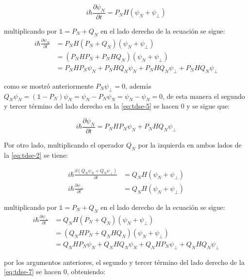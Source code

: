 \begin{equation}
   \label{eq:tdse-4}
  i\hbar\frac{\partial \psi_N}{\partial t} = P_NH (\psi_N + \psi_{\perp})
\end{equation}

multiplicando por $\mathbb{1}=P_N + Q_N$ en el lado derecho de la ecuación se sigue:
\begin{align}
  \label{eq:tdse-5}
 i\hbar\frac{\partial \psi_N}{\partial t}&= P_NH(P_N + Q_N) (\psi_N + \psi_{\perp})  \\ 
                                         &= (P_NHP_N + P_NHQ_N)(\psi_N + \psi_{\perp}) \\
  &= P_NHP_N\psi_N + P_NHQ_N\psi_N + P_NHQ_N\psi_{\perp} + P_NHQ_N\psi_{\perp}
\end{align}

como se mostró anteriormente $P_N\psi_{\perp}=0$, además $Q_N \psi_N = (\mathbb{1}-P_N)\psi_N = \psi_N - P_N\psi_N = \psi_N - \psi_N = 0$, de esta manera el segundo y tercer término del lado derecho en la \autoref{eq:tdse-5} se hacen $0$ y se sigue que:

\begin{equation}
  \label{eq:tdse-p1}
  i\hbar\frac{\partial \psi_N}{\partial t} = P_NHP_N\psi_N  + P_NHQ_N\psi_{\perp}
\end{equation}

Por otro lado, multiplicando el operador $Q_N$ por la izquierda en ambos lados de la \autoref{eq:tdse-2} se tiene:

\begin{align}
   \label{eq:tdse-6}
  i\hbar\frac{\partial (Q_N \psi_N + Q_N \psi_{\perp})}{\partial t} &= Q_NH (\psi_N + \psi_{\perp}) \\
  i\hbar\frac{\partial \psi_{\perp}}{\partial t} &= Q_NH (\psi_N + \psi_{\perp})
\end{align}

multiplicando por $\mathbb{1}=P_N + Q_N$ en el lado derecho de la ecuación se sigue:
\begin{align}
  \label{eq:tdse-7}
  i\hbar\frac{\partial \psi_{\perp}}{\partial t}&= Q_NH(P_N + Q_N) (\psi_N + \psi_{\perp})  \\ 
                                         &= (Q_NHP_N + Q_NHQ_N)(\psi_N + \psi_{\perp}) \\
                                          &= Q_NHP_N\psi_N + Q_NHQ_N\psi_N + Q_NHP_N\psi_{\perp} + Q_NHQ_N\psi_{\perp}
\end{align}

por los argumentos anteriores, el segundo y tercer término del lado derecho de la \autoref{eq:tdse-7} se hacen $0$, obteniendo:

